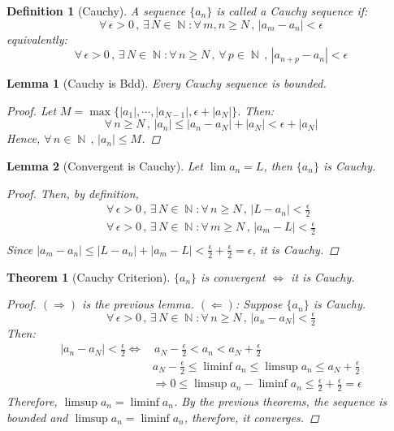 \documentclass[12pt]{article}
\let\RA\Rightarrow
\let\LA\Leftarrow
\let\LR\Leftrightarrow
\newcommand{\Forall}[1]{\forall\,{#1}\,,\,}
\newcommand{\Exist}[1]{\exists\,{#1}:}
\DeclareMathOperator{\N}{\mathbb{N}}
\newtheorem{theorem}{Theorem}[subsection]
\newtheorem{definition}{Definition}[subsection]
\newtheorem{lemma}{Lemma}[subsection]
\begin{document}
\begin{definition}[Cauchy]
  A sequence $\{a_n\}$ is called a Cauchy sequence if:
  $$\Forall{\epsilon>0}\Exist{N\in\N}\Forall{m,n\geq N} |a_m-a_n|<\epsilon$$
  equivalently:
  $$\Forall{\epsilon>0}\Exist{N\in\N}\Forall{n\geq N}\Forall{p\in\N} |a_{n+p}-a_n|<\epsilon$$
\end{definition}

\begin{lemma}[Cauchy is Bdd]
  Every Cauchy sequence is bounded.
  \begin{proof}
    Let $M=\max{\big\{|a_1|,\cdots,|a_{N-1}|, \epsilon+|a_N|\big\}}$. Then:
    $$\Forall{n\geq N}|a_n|\leq |a_n-a_N|+|a_N|<\epsilon+|a_N|$$
    Hence, $\Forall{n\in\N}|a_n|\leq M$.
  \end{proof}
\end{lemma}

\begin{lemma}[Convergent is Cauchy]
  Let $\lim a_n=L$, then $\{a_n\}$ is Cauchy.
  \begin{proof}
    Then, by definition,
    \begin{align*}
      \Forall{\epsilon>0}\Exist{N\in\N}\Forall{n\geq N}|L-a_n|<\tfrac{\epsilon}{2}\\
      \Forall{\epsilon>0}\Exist{N\in\N}\Forall{m\geq N}|a_m-L|<\tfrac{\epsilon}{2}\\
    \end{align*}
    Since $|a_m-a_n |\leq |L-a_n|+|a_m-L|<\tfrac{\epsilon}{2}+\tfrac{\epsilon}{2}=\epsilon$, it is Cauchy.
  \end{proof}
\end{lemma}

\begin{theorem}[Cauchy Criterion]
  $\{a_n\}$ is convergent $\LR$ it is Cauchy.
  \begin{proof}
    $(\RA)$ is the previous lemma. $(\LA)$: Suppose $\{a_n\}$ is Cauchy. $$\Forall{\epsilon>0}\Exist{N\in\N}\Forall{n\geq N}|a_n-a_N|<\tfrac{\epsilon}{2}$$
    Then:
    \begin{align*}
      |a_n-a_N|<\tfrac{\epsilon}{2}\LR&\, a_N-\tfrac{\epsilon}{2}<a_n<a_N+\tfrac{\epsilon}{2}\\
      & a_N-\tfrac{\epsilon}{2}\leq \liminf a_n \leq \limsup a_n\leq a_N+\tfrac{\epsilon}{2}\\
      &\RA 0 \leq \limsup a_n - \liminf a_n \leq \tfrac{\epsilon}{2}+\tfrac{\epsilon}{2}=\epsilon
    \end{align*}
    Therefore, $\limsup a_n = \liminf a_n$. By the previous theorems, the sequence is bounded and $\limsup a_n = \liminf a_n$, therefore, it converges.
  \end{proof}
\end{theorem}
\end{document}
